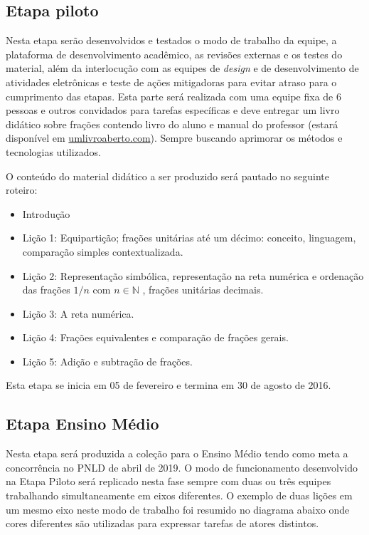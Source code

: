 \documentclass[10 pt]{article}
\begin{document}
\subsection{Etapa piloto}

Nesta etapa serão desenvolvidos e testados o modo de trabalho da equipe, a plataforma de desenvolvimento acadêmico, as revisões externas e os testes do material, além da interlocução com as equipes de {\it design} e de desenvolvimento de atividades eletrônicas e teste de ações mitigadoras para evitar atraso para o cumprimento das etapas. 
Esta parte será realizada com uma equipe fixa de 6 pessoas e outros convidados para tarefas específicas e deve entregar um livro didático sobre frações contendo livro do aluno e manual do professor (estará disponível em \url{umlivroaberto.com}). 
Sempre buscando aprimorar os métodos e tecnologias utilizados.

O conteúdo do material didático a ser produzido será pautado no seguinte roteiro:

\begin{itemize} %
  \item     Introdução
  \item     Lição 1: Equipartição; frações unitárias até um décimo: conceito, linguagem, comparação simples contextualizada.
  \item     Lição 2: Representação simbólica, representação na reta numérica e ordenação das frações     $1/n$  com  $n \in \mathbb{N}$    , frações unitárias decimais.
  \item     Lição 3: A reta numérica.
  \item     Lição 4: Frações equivalentes e comparação de frações gerais.
  \item     Lição 5: Adição e subtração de frações.
\end{itemize} %

Esta etapa se inicia em 05 de fevereiro e termina em 30 de agosto de 2016.

\subsection{Etapa Ensino Médio}

Nesta etapa será produzida a coleção para o Ensino Médio tendo como meta a concorrência no PNLD de abril de 2019.
O modo de funcionamento desenvolvido na Etapa Piloto será replicado nesta fase sempre com duas ou três equipes trabalhando simultaneamente em eixos diferentes.
O exemplo de duas lições em um mesmo eixo neste modo de trabalho foi resumido no diagrama abaixo onde cores diferentes são utilizadas para expressar tarefas de atores distintos.
\end{document}
